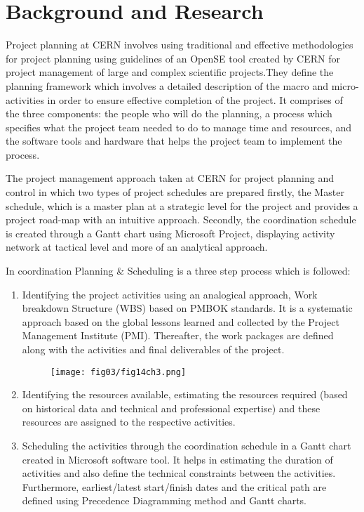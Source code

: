 \section{Background and Research}

Project planning at CERN \cite{article} involves using traditional and effective methodologies for project planning using guidelines of an OpenSE tool \cite{opense} created by CERN for project management of large and complex scientific projects.They define the planning framework which involves a detailed description of the macro and micro-activities in order to ensure effective completion of the project. It comprises of the three components: the people who will do the planning, a process which specifies what the project team needed to do to manage time and resources, and the software tools and hardware that helps the project team to implement the process.

The project management approach taken at CERN for project planning and control in which two types of project schedules are prepared firstly, the Master schedule, which is a master plan at a strategic level for the project and provides a project road-map with an intuitive approach. Secondly, the coordination schedule is created through a Gantt chart using Microsoft Project, displaying activity network at tactical level and more of an analytical approach.

In coordination Planning \& Scheduling is a three step process which is followed:
 
\begin{enumerate}
	\item Identifying the project activities using an analogical approach, Work breakdown Structure (WBS) based on PMBOK standards. It is a systematic approach based on the global lessons learned and collected by the Project Management Institute (PMI). Thereafter, the work packages are defined along with the activities and final deliverables of the project.
	
	\begin{figure}
		\centering
		\texttt{[image: fig03/fig14ch3.png]}
	\end{figure}

\item Identifying the resources available, estimating the resources required (based on historical data and technical and professional expertise) and these resources are assigned to the respective activities. 

\item  Scheduling the activities through the coordination schedule in a Gantt chart created in Microsoft software tool. It helps in estimating the duration of activities and also define the technical constraints between the activities. Furthermore, earliest/latest start/finish dates and the critical path are defined using Precedence Diagramming method and Gantt charts.

\end{enumerate}
\vspace{1cm}


